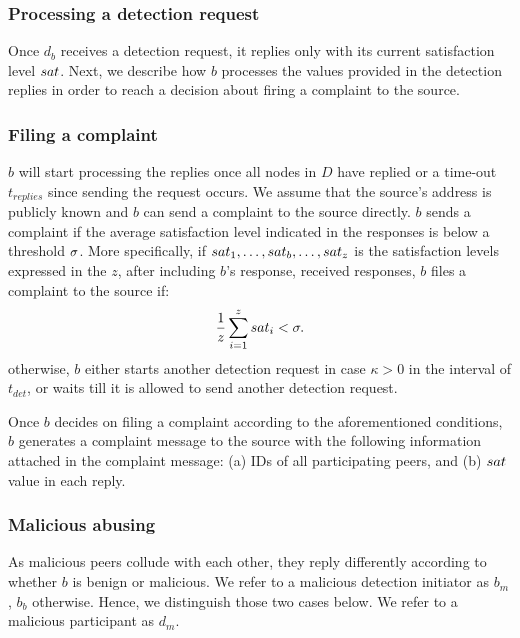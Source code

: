 \subsubsection*{Processing a detection request}
Once $d_b$ receives a detection request, it replies only with its current satisfaction level $sat$.
Next, we describe how $b$ processes the values provided in the detection replies in order to reach a decision about firing a complaint to the source.

\subsubsection*{Filing a complaint}

$b$ will start processing the replies once all nodes in $D$ have replied or a time-out $t_{replies}$ since sending the request occurs. 
We assume that the source's address is publicly known and $b$ can send a complaint to the source directly.
$b$ sends a complaint if the average satisfaction level indicated in the responses is below a threshold $\sigma$.
More specifically, if $sat_1, \ldots , sat_b, \ldots ,sat_z$ is the satisfaction levels expressed in the $z$, after including $b$'s response, received responses,
$b$ files a complaint to the source if:
\begin{align}
\label{eq:drop_satis_equation}
\frac{1}{z}\sum_{i=1}^{z} \sat_i< \satThres. 
\end{align} 
otherwise, $b$ either starts another detection request in case $\kappa >0$ in the interval of $t_{det}$, or waits till it is allowed to send another detection request.

Once $b$ decides on filing a complaint according to the aforementioned conditions, $b$ generates a complaint message to the source with the following information attached in the complaint message: 
(a) IDs of all participating peers, and (b) $sat$ value in each reply.

\subsubsection*{Malicious abusing}

As malicious peers collude with each other, they reply differently according to whether $b$ is benign or malicious.
We refer to a malicious detection initiator as $b_m$, $b_b$ otherwise.
Hence, we distinguish those two cases below. We refer to a malicious participant as $d_m$.

